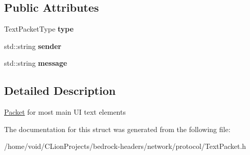 \subsection*{Public Attributes}
\begin{DoxyCompactItemize}
\item 
\mbox{\label{struct_text_packet_ac500229e8c387e54f10971c102a6c7de}} 
Text\+Packet\+Type {\bfseries type}
\item 
\mbox{\label{struct_text_packet_aec77098e4fbab468885e8a00ffd7821c}} 
std\+::string {\bfseries sender}
\item 
\mbox{\label{struct_text_packet_aaab878bbad582fc4fb688cac3e2acae7}} 
std\+::string {\bfseries message}
\end{DoxyCompactItemize}


\subsection{Detailed Description}
\mbox{\hyperlink{struct_packet}{Packet}} for most main UI text elements 

The documentation for this struct was generated from the following file\+:\begin{DoxyCompactItemize}
\item 
/home/void/\+C\+Lion\+Projects/bedrock-\/headers/network/protocol/Text\+Packet.\+h\end{DoxyCompactItemize}
